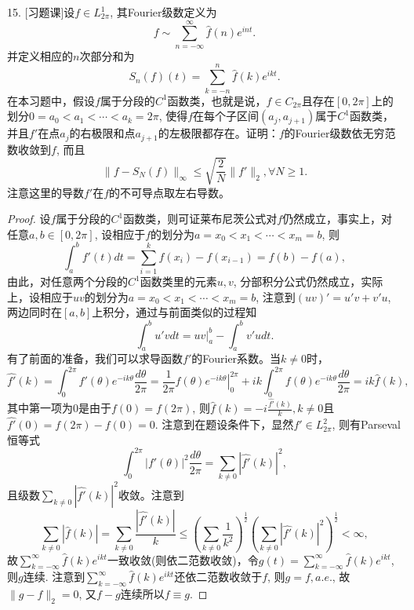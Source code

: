 \documentclass[a4paper,8pt]{ctexart}\textwidth 140mm \textheight 216mm
\newcommand{\8}{\infty}
\begin{document}
15. [习题课]设$f\in L_{2\pi}^1$, 其Fourier级数定义为
$$f\sim\sum_{n=-\infty}^\infty\hat{f}(n)e^{int}.$$
并定义相应的$n$次部分和为
$$S_n(f)(t)=\sum_{k=-n}^n\hat{f}(k)e^{ikt}.$$
在本习题中，假设$f$属于分段的$C^1$函数类，也就是说，$f\in C_{2\pi}$且存在$[0,2\pi]$上的划分$0=a_0<a_1<\cdots<a_k=2\pi$, 使得$f$在每个子区间$(a_j,a_{j+1})$属于$C^1$函数类，并且$f'$在点$a_j$的右极限和点$a_{j+1}$的左极限都存在。证明：$f$的Fourier级数依无穷范数收敛到$f$, 而且
$$\|f-S_N(f)\|_\infty\leq \sqrt{\frac{2}{N}}\|f'\|_2,\forall N\geq 1.$$
注意这里的导数$f'$在$f$的不可导点取左右导数。
\begin{proof}
	设$f$属于分段的$C^1$函数类，则可证莱布尼茨公式对$f$仍然成立，事实上，对任意$a,b\in[0,2\pi]$, 设相应于$f$的划分为$a=x_0<x_1<\cdots<x_m=b$, 则
	\begin{equation*}
	\int_a^b f'(t)dt=\sum_{i=1}^k f(x_i)-f(x_{i-1})=f(b)-f(a),
	\end{equation*} 
	由此，对任意两个分段的$C^1$函数类里的元素$u,v$, 分部积分公式仍然成立，实际上，设相应于$uv$的划分为$a=x_0<x_1<\cdots<x_m=b$, 注意到$(uv)'=u'v+v'u$, 两边同时在$[a,b]$上积分，通过与前面类似的过程知
	$$\int_a^b u'vdt=\left.uv\right|_a^b-\int_a^bv'udt.$$
	有了前面的准备，我们可以求导函数$f'$的Fourier系数。当$k\ne 0$时，
	\begin{equation*}
	\hat{f'}(k)=\int_0^{2\pi}f'(\theta)e^{-ik\theta}\frac{d\theta}{2\pi}=\frac{1}{2\pi}\left.f(\theta)e^{-ik\theta}\right|_0^{2\pi}+ik\int_0^{2\pi}f(\theta)e^{-ik\theta}\frac{d\theta}{2\pi}=ik\hat{f}(k),
	\end{equation*}
	其中第一项为0是由于$f(0)=f(2\pi)$, 则$\hat{f}(k)=-i\frac{\hat{f'}(k)}{k}, k\ne 0$且$\hat{f'}(0)=f(2\pi)-f(0)=0$. 注意到在题设条件下，显然$f'\in L_{2\pi}^2$, 则有Parseval恒等式
	\begin{equation*}
	\int_0^{2\pi}|f'(\theta)|^2\frac{d\theta}{2\pi}=\sum_{k\ne 0}|\hat{f'}(k)|^2,
	\end{equation*} 
	且级数$\sum_{k\ne 0}|\hat{f'}(k)|^2$收敛。注意到
	\begin{equation*}
	\sum_{k\ne 0}|\hat{f}(k)|=\sum_{k\ne 0}\frac{|\hat{f'}(k)|}{k}\leq (\sum_{k\ne 0}\frac{1}{k^2})^{\frac{1}{2}}(\sum_{k\ne 0}|\hat{f'}(k)|^2)^{\frac{1}{2}}<\infty,
	\end{equation*}
	故$\sum_{k=-\infty}^\infty\hat{f}(k)e^{ikt}$一致收敛(则依二范数收敛)，令$g(t)=\sum_{k=-\infty}^\infty\hat{f}(k)e^{ikt}$, 则$g$连续. 注意到$\sum_{k=-\infty}^\infty\hat{f}(k)e^{ikt}$还依二范数收敛于$f$, 则$g=f,a.e.$, 故$\|g-f\|_2=0$, 又$f-g$连续所以$f\equiv g$.  
	

\end{proof}
\end{document}
